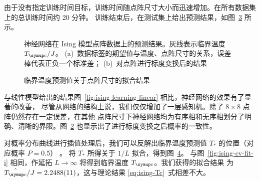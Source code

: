 由于没有指定训练时间目标，训练时间随点阵尺寸大小而迅速增加。在所有数据集上的总训练时间约 20 分钟。
训练结束后，在测试集上给出预测结果，如图~\ref{fig:ising-learning-net-total} 所示。

\begin{figure}[htb]
  \centering
  \begin{subfigure}[b]{0.47\textwidth}
    \centering
    \label{fig:ising-learning-net}
  \end{subfigure}
  \begin{subfigure}[b]{0.47\textwidth}
    \centering
    \label{fig:ising-learning-net-scaled}
  \end{subfigure}
  \caption{神经网络在 Ising 模型点阵数据上的预测结果。灰线表示临界温度 $\Tc/J$。
    (a)~数据标签的期望值与温度、点阵尺寸的关系，误差棒代表正负一个标准差；
    (b)~对点阵进行标度变换后的结果}
  \label{fig:ising-learning-net-total}
\end{figure}

\begin{figure}[htb]
  \centering
  \caption{临界温度预测值关于点阵尺寸的拟合结果}
  \label{fig:ising-learning-net-fit}
\end{figure}

与线性模型给出的结果图~\ref{fig:ising-learning-linear} 相比，神经网络的效果有了显著的改善，
尽管从网络的结构上说，我们仅仅增加了一层感知机。除了 $8 \times 8$ 点阵仍然存在一定误差，在其他
点阵尺寸下神经网络均为有序相和无序相划分了明确、清晰的界限。图~\ref{fig:ising-learning-net-scaled}
也显示出了进行标度变换之后概率的一致性。

对概率分布曲线进行插值处理后，我们可以反解出临界温度预测值 $T_*$ 的位置（对应概率 $P=0.5$）
\cite{phase}。 将 $T_*$ 所得关于 $1/L$ 拟合，得到图~\ref{fig:ising-learning-net-fit}。
与图~\ref{fig:ising-cv-fit-i} 相同，作延拓 $L\to\infty$ 将得到临界温度 $\Tc$。我们获得的拟合结果
为 $\hat{\Tc}/J=\num{2.2488(11)}$，这与理论结果 \eqref{eq:ising-Tc}~式相差不大。
